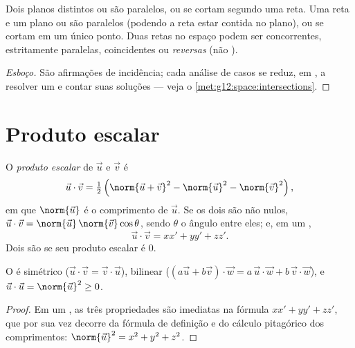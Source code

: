 \begin{proposition}\label{prop:g12:space:positions}
Dois planos distintos ou são paralelos, ou se cortam segundo uma reta. Uma
reta e um plano ou são paralelos (podendo a reta estar contida no plano),
ou se cortam em um único ponto. Duas retas no espaço podem ser
concorrentes, estritamente paralelas, coincidentes ou \emph{reversas} (não
).
\end{proposition}

\begin{proof}[Esboço]
São afirmações de incidência; cada análise de casos se reduz, em
, a resolver um  e contar suas soluções --- veja
o \cref{met:g12:space:intersections}.
\end{proof}

\section{Produto escalar}

\begin{definition}\label{def:g12:space:dot}
O \emph{produto escalar} de $\vec u$ e $\vec v$ é
\[
\vec u \cdot \vec v = \tfrac12\left(\norm{\vec u + \vec v}^2
- \norm{\vec u}^2 - \norm{\vec v}^2\right),
\]
em que $\norm{\vec u}$ é o comprimento de $\vec u$. Se os dois  são
não nulos, $\vec u \cdot \vec v = \norm{\vec u}\,\norm{\vec v}\cos\theta$,
sendo $\theta$ o ângulo entre eles; e, em um 
\emph{},
\[
\vec u \cdot \vec v = xx' + yy' + zz' .
\]
Dois  são \emph{} se seu produto escalar é $0$.
\end{definition}

\begin{proposition}[Propriedades]\label{prop:g12:space:dotprops}
O  é simétrico ($\vec u\cdot\vec v = \vec v\cdot\vec u$),
bilinear ($(a\vec u + b\vec v)\cdot \vec w = a\,\vec u\cdot\vec w +
b\,\vec v\cdot \vec w$), e
$\vec u \cdot \vec u = \norm{\vec u}^2 \geq 0$.
\end{proposition}

\begin{proof}
Em um , as três propriedades são imediatas na fórmula
$xx' + yy' + zz'$, que por sua vez decorre da fórmula de definição e do
cálculo pitagórico dos comprimentos:
$\norm{\vec u}^2 = x^2 + y^2 + z^2$.
\end{proof}


